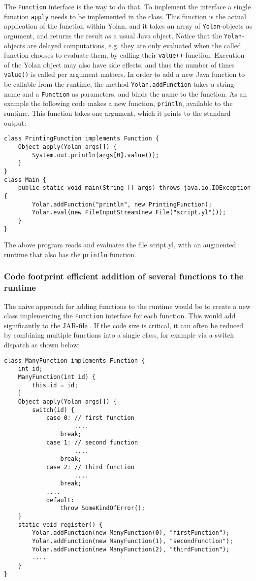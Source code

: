 \documentclass[11pt]{report}
\begin{document}
The \verb|Function| interface is the way to do that. To implement the interface a single function \verb|apply| needs to be implemented in the class. 
This function is the actual application of the function within Yolan, and
it takes an array of \verb|Yolan|-objects as argument, and returns the result as a usual Java object.
Notice that the \verb|Yolan|-objects are delayed computations, e.g. they are only evaluated when the called function chooses to evaluate them, by calling their \verb|value()|-function.
Execution of the Yolan object may also have side effects, and thus the number of times \verb|value()| is called per argument matters.
In order to add a new Java function to be callable from the runtime, the method \verb|Yolan.addFunction| takes a string name and a \verb|Function| as parameters, and binds the name to the function. As an example the following code makes a new function, \verb|println|, available to the runtime. This function takes one argument, which it prints to the standard output:
\begin{lstlisting}
class PrintingFunction implements Function {
    Object apply(Yolan args[]) {
        System.out.println(args[0].value());
    }
}
class Main {
    public static void main(String [] args) throws java.io.IOException {
        Yolan.addFunction("println", new PrintingFunction);
        Yolan.eval(new FileInputStream(new File("script.yl")));
    }
}
\end{lstlisting} 
The above program reads and evaluates the file script.yl, with an augmented runtime that also has the \verb|println| function.

\subsubsection{Code footprint efficient addition of several functions to the runtime}
The naive approach for adding functions to the runtime would be to create a new class implementing the \verb|Function| interface for each function. This would add significantly to the JAR-file
.
If the code size is critical, it can often be reduced by combining multiple functions into a single class, for example via a switch dispatch as shown below:
\begin{lstlisting}
class ManyFunction implements Function {
    int id;
    ManyFunction(int id) {
        this.id = id;
    }
    Object apply(Yolan args[]) {
        switch(id) {
            case 0: // first function
                    ....
                break;
            case 1: // second function
                    ....
                break;
            case 2: // third function
                    ....
                break;
            ....
            default:
                throw SomeKindOfError();
    }
    static void register() {
        Yolan.addFunction(new ManyFunction(0), "firstFunction");
        Yolan.addFunction(new ManyFunction(1), "secondFunction");
        Yolan.addFunction(new ManyFunction(2), "thirdFunction");
        ....
    }
}
\end{lstlisting}
\end{document}
